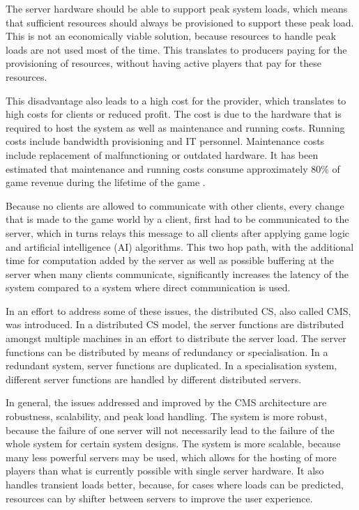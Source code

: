\documentclass[journal,oneside,a4paper,onecolumn]{IEEEtran}
\begin{document}
The server hardware should be able to support peak system loads, which means that sufficient resources should always be provisioned to support these peak load. This is not an economically viable solution, because resources to handle peak loads are not used most of the time. This translates to producers paying for the provisioning of resources, without having active players that pay for these resources.

This disadvantage also leads to a high cost for the provider, which translates to high costs for clients or reduced profit. The cost is due to the hardware that is required to host the system as well as maintenance and running costs. Running costs include bandwidth provisioning and IT personnel. Maintenance costs include replacement of malfunctioning or outdated hardware. It has been estimated that maintenance and running costs consume approximately 80\% of game revenue during the lifetime of the game \cite{cs_mmog_cost}.

Because no clients are allowed to communicate with other clients, every change that is made to the game world by a client, first had to be communicated to the server, which in turns relays this message to all clients after applying game logic and artificial intelligence (AI) algorithms. This two hop path, with the additional time for computation added by the server as well as possible buffering at the server when many clients communicate, significantly increases the latency of the system compared to a system where direct communication is used.

In an effort to address some of these issues, the distributed \ac{CS}, also called \ac{CMS}, was introduced. In a distributed \ac{CS} model, the server functions are distributed amongst multiple machines in an effort to distribute the server load. The server functions can be distributed by means of redundancy or specialisation. In a redundant system, server functions are duplicated. In a specialisation system, different server functions are handled by different distributed servers.

In general, the issues addressed and improved by the \ac{CMS} architecture are robustness, scalability, and peak load handling. The system is more robust, because the failure of one server will not necessarily lead to the failure of the whole system for certain system designs. The system is more scalable, because many less powerful servers may be used, which allows for the hosting of more players than what is currently possible with single server hardware. It also handles transient loads better, because, for cases where loads can be predicted, resources can by shifter between servers to improve the user experience.
\end{document}
